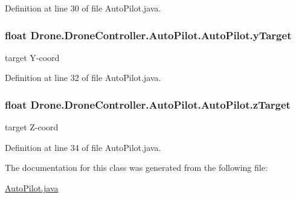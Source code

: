 Definition at line 30 of file Auto\+Pilot.\+java.

\hypertarget{class_drone_1_1_drone_controller_1_1_auto_pilot_1_1_auto_pilot_a2b12dc818a6868850498f3626bdfd62f}{}
\subsubsection[{y\+Target}]{\setlength{\rightskip}{0pt plus 5cm}float Drone.\+Drone\+Controller.\+Auto\+Pilot.\+Auto\+Pilot.\+y\+Target\hspace{0.3cm}{\ttfamily [protected]}}\label{class_drone_1_1_drone_controller_1_1_auto_pilot_1_1_auto_pilot_a2b12dc818a6868850498f3626bdfd62f}
target Y-\/coord 

Definition at line 32 of file Auto\+Pilot.\+java.

\hypertarget{class_drone_1_1_drone_controller_1_1_auto_pilot_1_1_auto_pilot_a35b8ee5b8a76195dcb7804ec2d6e9f8f}{}
\subsubsection[{z\+Target}]{\setlength{\rightskip}{0pt plus 5cm}float Drone.\+Drone\+Controller.\+Auto\+Pilot.\+Auto\+Pilot.\+z\+Target\hspace{0.3cm}{\ttfamily [protected]}}\label{class_drone_1_1_drone_controller_1_1_auto_pilot_1_1_auto_pilot_a35b8ee5b8a76195dcb7804ec2d6e9f8f}
target Z-\/coord 

Definition at line 34 of file Auto\+Pilot.\+java.



The documentation for this class was generated from the following file\+:\begin{DoxyCompactItemize}
\item 
\hyperlink{_auto_pilot_8java}{Auto\+Pilot.\+java}\end{DoxyCompactItemize}
